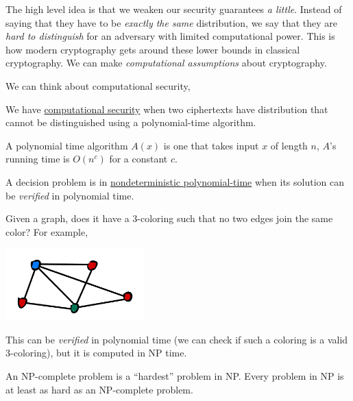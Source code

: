 The high level idea is that we weaken our security guarantees \emph{a little}. Instead of saying that they have to be \emph{exactly the same} distribution, we say that they are \emph{hard to distinguish} for an adversary with limited computational power. This is how modern cryptography gets around these lower bounds in classical cryptography. We can make \emph{computational assumptions} about cryptography.

We can think about computational security,
\begin{definition}\label{def:computational-security}
    We have \ul{computational security} when two ciphertexts have distribution that cannot be distinguished using a polynomial-time algorithm.
\end{definition}

\begin{definition}
    A polynomial time algorithm $A(x)$ is one that takes input $x$ of length $n$, $A$'s running time is $O(n^c)$ for a constant $c$.
\end{definition}
\begin{definition}
    A decision problem is in \ul{nondeterministic polynomial-time} when its solution can be \emph{verified} in polynomial time.
\end{definition}
\begin{example}
    Given a graph, does it have a $3$-coloring such that no two edges join the same color? For example,

    \begin{center}
        \includegraphics[width=0.4\textwidth]{images/2023-01-31/graph-coloring.png}
    \end{center}

    This can be \emph{verified} in polynomial time (we can check if such a coloring is a valid $3$-coloring), but it is computed in \textsf{NP} time.
\end{example}
\begin{definition}
    An \textsf{NP}-complete problem is a ``hardest'' problem in \textsf{NP}. Every problem in \textsf{NP} is at least as hard as an \textsf{NP}-complete problem.
\end{definition}

